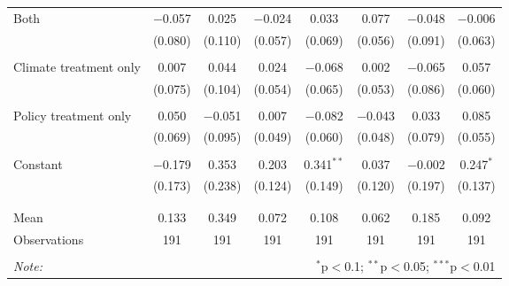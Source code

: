\begin{tabular}{@{\extracolsep{5pt}}lccccccc}
 Both & $-$0.057 & 0.025 & $-$0.024 & 0.033 & 0.077 & $-$0.048 & $-$0.006 \\ 
  & (0.080) & (0.110) & (0.057) & (0.069) & (0.056) & (0.091) & (0.063) \\ 
  & & & & & & & \\ 
 Climate treatment only & 0.007 & 0.044 & 0.024 & $-$0.068 & 0.002 & $-$0.065 & 0.057 \\ 
  & (0.075) & (0.104) & (0.054) & (0.065) & (0.053) & (0.086) & (0.060) \\ 
  & & & & & & & \\ 
 Policy treatment only & 0.050 & $-$0.051 & 0.007 & $-$0.082 & $-$0.043 & 0.033 & 0.085 \\ 
  & (0.069) & (0.095) & (0.049) & (0.060) & (0.048) & (0.079) & (0.055) \\ 
  & & & & & & & \\ 
 Constant & $-$0.179 & 0.353 & 0.203 & 0.341$^{**}$ & 0.037 & $-$0.002 & 0.247$^{*}$ \\ 
  & (0.173) & (0.238) & (0.124) & (0.149) & (0.120) & (0.197) & (0.137) \\ 
  & & & & & & & \\ 
\hline \\[-1.8ex] 
Mean & 0.133 & 0.349 & 0.072 & 0.108 & 0.062 & 0.185 & 0.092 \\ 
Observations & 191 & 191 & 191 & 191 & 191 & 191 & 191 \\ 
\hline 
\hline \\[-1.8ex] 
\textit{Note:}  & \multicolumn{7}{r}{$^{*}$p$<$0.1; $^{**}$p$<$0.05; $^{***}$p$<$0.01} \\ 
\end{tabular} 
